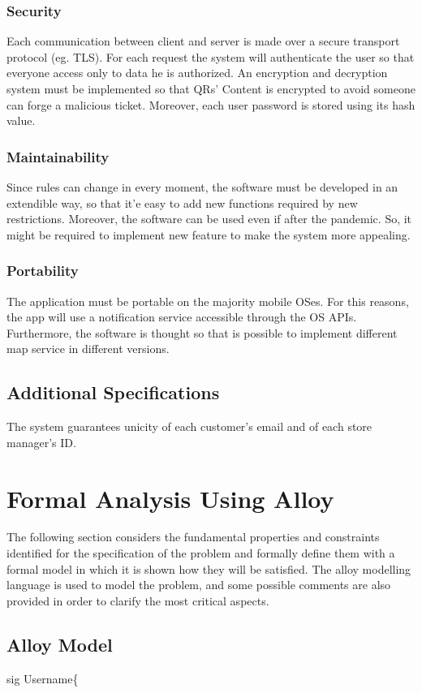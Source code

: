 \documentclass{article}
\begin{document}
		\subsubsection{Security}
		Each communication between client and server is made over a secure transport protocol (eg. TLS). For each request the system will authenticate the user so that everyone access only to data he is authorized. An encryption and decryption system must be implemented so that QRs' Content is encrypted to avoid someone can forge a malicious ticket. Moreover, each user password is stored using its hash value. 
		\subsubsection{Maintainability}
		Since rules can change in every moment, the software must be developed in an extendible way, so that it'e easy to add new functions required by new restrictions. Moreover, the software can be used even if after the pandemic. So, it might be required to implement new feature to make the system more appealing.
		\subsubsection{Portability}
		The application must be portable on the majority mobile OSes. For this reasons, the app will use a notification service accessible through the OS APIs. Furthermore, the software is thought so that is possible to implement different map service in different versions.
		\subsection{Additional Specifications}
	The system guarantees unicity of each customer's email and of each store manager's ID.
	
	
	
\section{Formal Analysis Using Alloy}
	The following section considers the fundamental properties and constraints identified for the specification of the problem and formally define them with a formal model in which it is shown how they will be satisfied. The alloy modelling language is used to model the problem, and some possible comments are also provided in order to clarify the most critical aspects. 
	\subsection{Alloy Model}
	sig Username\{
	
\end{document}
